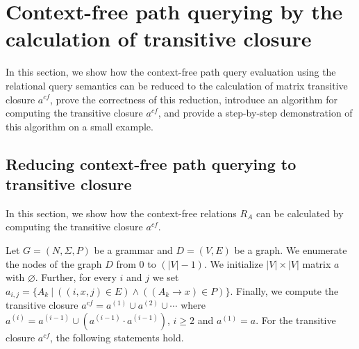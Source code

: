 \section{Context-free path querying by the calculation of transitive closure}
In this section, we show how the context-free path query evaluation using the relational query semantics can be reduced to the calculation of matrix transitive closure $a^{cf}$, prove the correctness of this reduction, introduce an algorithm for computing the transitive closure $a^{cf}$, and provide a step-by-step demonstration of this algorithm on a small example.

\subsection{Reducing context-free path querying to transitive closure} \label{section_reducing}
In this section, we show how the context-free relations $R_A$ can be calculated by computing the transitive closure $a^{cf}$.

Let $G = (N,\Sigma,P)$ be a grammar and $D = (V, E)$ be a graph. We enumerate the nodes of the graph $D$ from 0 to $(|V| - 1)$. We initialize $|V| \times |V|$ matrix $a$ with $\varnothing$. Further, for every $i$ and $j$ we set $a_{i,j} = \{A_k~|~((i,x,j) \in E) \wedge ((A_k \rightarrow x) \in P)\}$. Finally, we compute the transitive closure $a^{cf} = a^{(1)} \cup a^{(2)} \cup \cdots$ where $a^{(i)} = a^{(i-1)} \cup (a^{(i-1)} \cdot a^{(i-1)})$, $i \ge 2$ and $a^{(1)} = a$. For the transitive closure $a^{cf}$, the following statements hold.

